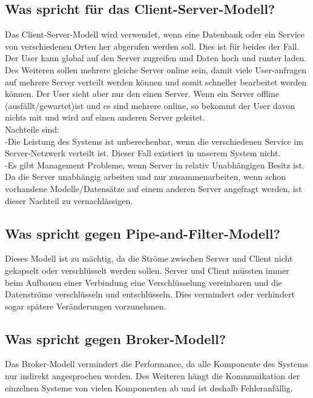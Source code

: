 \subsection*{Was spricht für das Client-Server-Modell?}
Das Client-Server-Modell wird verwendet, wenn eine Datenbank oder ein Service von verschiedenen Orten her abgerufen werden soll. Dies ist für beides der Fall. Der User kann global auf den Server zugreifen und Daten hoch und runter laden.\\
Des Weiteren sollen mehrere gleiche Server online sein, damit viele User-anfragen auf mehrere Server verteilt werden können und somit schneller bearbeitet werden können. Der User sieht aber nur den einen Server. Wenn ein Server offline (ausfällt/gewartet)ist und es sind mehrere online, so bekommt der User davon nichts mit und wird auf einen anderen Server geleitet.\\
Nachteile sind:\\
-Die Leistung des Systems ist unberechenbar, wenn die verschiedenen Service im Server-Netzwerk verteilt ist. Dieser Fall existiert in unserem System nicht.\\
-Es gibt Management Probleme, wenn Server in relativ Unabhängigen Besitz ist. Da die Server unabhängig arbeiten und nur zusammenarbeiten, wenn schon vorhandene Modelle/Datensätze auf einem anderen Server angefragt werden, ist dieser Nachteil zu vernachlässigen.

\subsection*{Was spricht gegen Pipe-and-Filter-Modell?}
Dieses Modell ist zu mächtig, da die Ströme zwischen Server und Client nicht gekapselt oder verschlüsselt werden sollen. Server und Client müssten immer beim Aufbauen einer Verbindung eine Verschlüsselung vereinbaren und die Datenströme verschlüsseln und entschlüsseln. Dies vermindert oder verhindert sogar spätere Veränderungen vorzunehmen.

\subsection*{Was spricht gegen Broker-Modell?}
Das Broker-Modell vermindert die Performance, da alle Komponente des Systems nur indirekt angesprochen werden. Des Weiteren hängt die Kommunikation der einzelnen Systeme von vielen Komponenten ab und ist deshalb Fehleranfällig.
